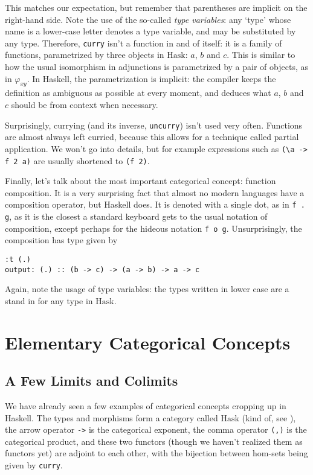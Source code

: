 \documentclass[11pt]{article}
\theoremstyle{nonumberplain}
\newcommand{\Hask}{\mathrm{Hask}}
\newcommand*\lsin{\lstinline}
\begin{document}
This matches our expectation, but remember that parentheses are implicit on the right-hand side. Note the use of the so-called \emph{type variables}: any `type' whose name is a lower-case letter denotes a type variable, and may be substituted by any type. Therefore, \lsin|curry| isn't a function in and of itself: it is a family of functions, parametrized by three objects in $\Hask$: $a$, $b$ and $c$. This is similar to how the usual isomorphism in adjunctions is parametrized by a pair of objects, as in $\varphi_{xy}$. In Haskell, the parametrization is implicit: the compiler keeps the definition as ambiguous as possible at every moment, and deduces what $a$, $b$ and $c$ should be from context when necessary.

Surprisingly, currying (and its inverse, \lsin|uncurry|) isn't used very often. Functions are almost always left curried, because this allows for a technique called partial application. We won't go into details, but for example expressions such as \lsin|(\a -> f 2 a)| are usually shortened to \lsin|(f 2)|.

Finally, let's talk about the most important categorical concept: function composition. It is a very surprising fact that almost no modern languages have a composition operator, but Haskell does. It is denoted with a single dot, as in \lsin|f . g|, as it is the closest a standard keyboard gets to the usual notation of composition, except perhaps for the hideous notation \lsin|f o g|. Unsurprisingly, the composition has type given by
\begin{lstlisting}
:t (.)
output: (.) :: (b -> c) -> (a -> b) -> a -> c
\end{lstlisting}

Again, note the usage of type variables: the types written in lower case are a stand in for any type in $\Hask$.


\section{Elementary Categorical Concepts}

\subsection{A Few Limits and Colimits}\label{limcolim}

We have already seen a few examples of categorical concepts cropping up in Haskell. The types and morphisms form a category called $\Hask$ (kind of, see \cite{haskisnotcat}), the arrow operator \lsin|->| is the categorical exponent, the comma operator \lsin|(,)| is the categorical product, and these two functors (though we haven't realized them as functors yet) are adjoint to each other, with the bijection between hom-sets being given by \lsin|curry|.
\end{document}

